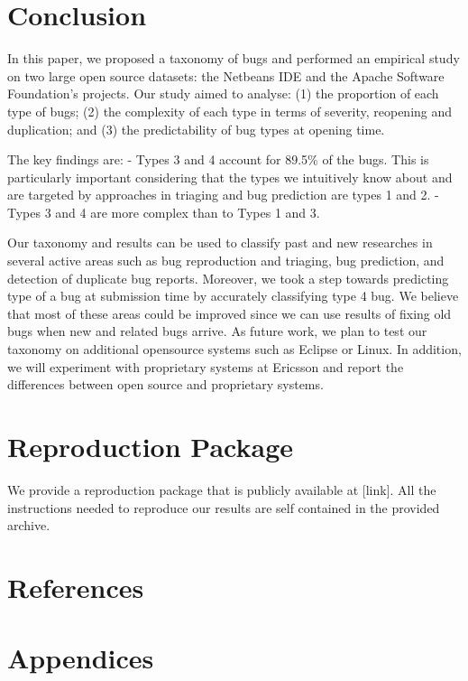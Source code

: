 \documentclass[natbib]{svjour3}
\begin{document}
\section{Conclusion}\label{conclusion}

In this paper, we proposed a taxonomy of bugs and performed an empirical
study on two large open source datasets: the Netbeans IDE and the Apache
Software Foundation's projects. Our study aimed to analyse: (1) the
proportion of each type of bugs; (2) the complexity of each type in
terms of severity, reopening and duplication; and (3) the predictability
of bug types at opening time.

The key findings are: - Types 3 and 4 account for 89.5\% of the bugs.
This is particularly important considering that the types we intuitively
know about and are targeted by approaches in triaging and bug prediction
are types 1 and 2. - Types 3 and 4 are more complex than to Types 1 and
3.

Our taxonomy and results can be used to classify past and new researches
in several active areas such as bug reproduction and triaging, bug
prediction, and detection of duplicate bug reports. Moreover, we took a
step towards predicting type of a bug at submission time by accurately
classifying type 4 bug. We believe that most of these areas could be
improved since we can use results of fixing old bugs when new and
related bugs arrive. As future work, we plan to test our taxonomy on
additional opensource systems such as Eclipse or Linux. In addition, we
will experiment with proprietary systems at Ericsson and report the
differences between open source and proprietary systems.

\section{Reproduction Package}\label{reproduction-package}

We provide a reproduction package that is publicly available at
{[}link{]}. All the instructions needed to reproduce our results are
self contained in the provided archive.

\section{References}\label{references}

\printbibliography

\section{Appendices}\label{appendices}
\end{document}
